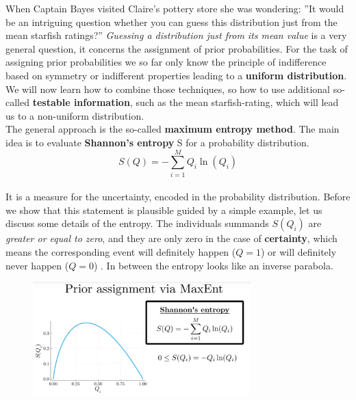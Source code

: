 \documentclass[12pt, a4paper]{scrartcl}
\begin{document}
When Captain Bayes visited Claire’s pottery store she was wondering:
”It would be an intriguing question whether you can guess
this distribution just from the mean starfish ratings?”
\textit{Guessing a distribution just from its mean value} is a very general question, it
concerns the assignment of prior probabilities. For the task of assigning
prior probabilities we so far only know the principle of indifference based on
symmetry or indifferent properties leading to a \textbf{uniform distribution}.
We will now learn how to combine those techniques, so how to use additional
so-called \textbf{testable information}, such as the mean starfish-rating, which will
lead us to a non-uniform distribution.\\

The general approach is the so-called \textbf{maximum entropy method}. The main
idea is to evaluate \textbf{Shannon’s entropy} S for a probability distribution.%
\begin{equation*}\boxed{S(Q)=-\sum_{i=1}^MQ_i\ln(Q_i)
}\end{equation*}\\
It is a measure for the uncertainty, encoded in the probability distribution.
Before we show that this statement is plausible guided by a simple example,
let us discuss some details of the entropy.
The individuals summands $S(Q_i)$ are \textit{greater or equal to zero},
and they are only zero in the case of \textbf{certainty}, which means the corresponding event
will definitely happen ($Q = 1$) or will definitely never happen
($Q = 0$) .
In between the entropy looks like an inverse parabola.\\%
 \begin{figure}[H]
	\centering
	\includegraphics[width=0.75\textwidth]{6_3.png}
\end{figure}
\end{document}
